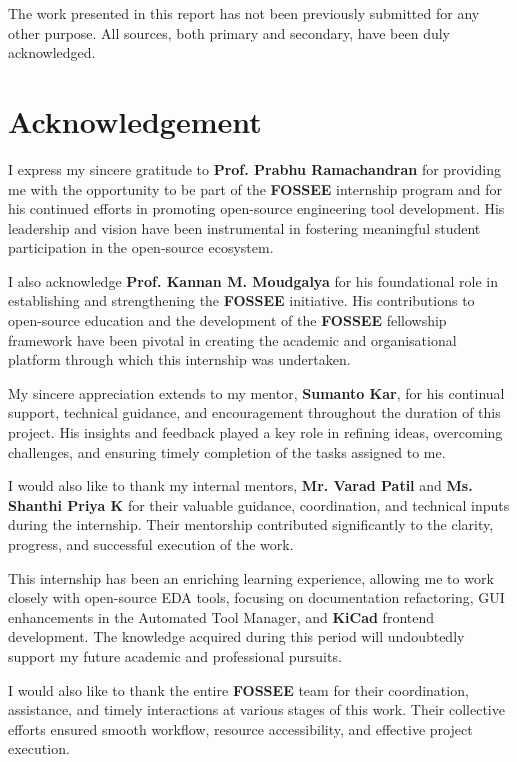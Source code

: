 \documentclass[12pt,a4paper]{report}
\begin{document}
The work presented in this report has not been previously submitted for any other purpose. All sources, both primary and secondary, have been duly acknowledged.



\chapter*{Acknowledgement}
I express my sincere gratitude to \textbf{Prof. Prabhu Ramachandran} for providing me with the opportunity to be part of the \textbf{FOSSEE} internship program and for his continued efforts in promoting open-source engineering tool development. His leadership and vision have been instrumental in fostering meaningful student participation in the open-source ecosystem.

I also acknowledge \textbf{Prof. Kannan M. Moudgalya} for his foundational role in establishing and strengthening the \textbf{FOSSEE} initiative. His contributions to open-source education and the development of the \textbf{FOSSEE} fellowship framework have been pivotal in creating the academic and organisational platform through which this internship was undertaken.

My sincere appreciation extends to my mentor, \textbf{Sumanto Kar}, for his continual support, technical guidance, and encouragement throughout the duration of this project. His insights and feedback played a key role in refining ideas, overcoming challenges, and ensuring timely completion of the tasks assigned to me.

I would also like to thank my internal mentors, \textbf{Mr. Varad Patil} and \textbf{Ms. Shanthi Priya K} for their valuable guidance, coordination, and technical inputs during the internship. Their mentorship contributed significantly to the clarity, progress, and successful execution of the work.

This internship has been an enriching learning experience, allowing me to work closely with open-source EDA tools, focusing on documentation refactoring, GUI enhancements in the Automated Tool Manager, and \textbf{KiCad} frontend development. The knowledge acquired during this period will undoubtedly support my future academic and professional pursuits.

I would also like to thank the entire \textbf{FOSSEE} team for their coordination, assistance, and timely interactions at various stages of this work. Their collective efforts ensured smooth workflow, resource accessibility, and effective project execution.
\end{document}

